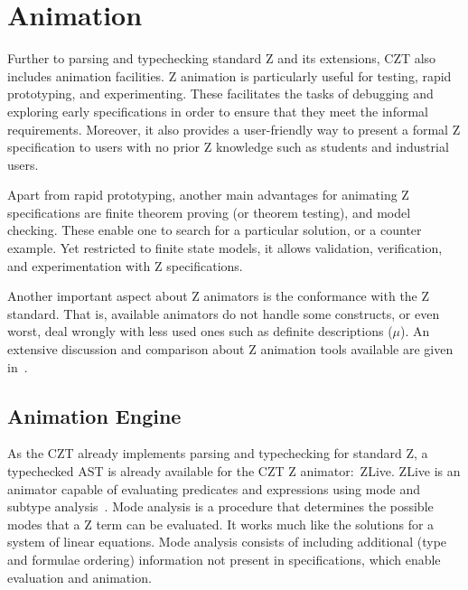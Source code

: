 \documentclass{llncs}
\begin{document}
\section{Animation}
\label{animation}

    Further to parsing and typechecking standard Z and its extensions,
    CZT also includes animation facilities. Z animation is
    particularly useful for testing, rapid prototyping, and
    experimenting. These facilitates the tasks of debugging and
    exploring early specifications in order to ensure that they meet
    the informal requirements.  Moreover, it also provides a
    user-friendly way to present a formal Z specification to users
    with no prior Z knowledge such as students and industrial users.

    Apart from rapid prototyping, another main advantages for
    animating Z specifications are finite theorem proving (or theorem
    testing), and model checking.  These enable one to search for a
    particular solution, or a counter example.  Yet restricted to
    finite state models, it allows validation, verification, and
    experimentation with Z specifications.

    Another important aspect about Z animators is the conformance with
    the Z standard.  That is, available animators do not handle some
    constructs, or even worst, deal wrongly with less used ones such
    as definite descriptions ($\mu$).  An extensive discussion and
    comparison about Z animation tools available are given
    in~\cite{utting-jaza}.

\subsection{Animation Engine}

    As the CZT already implements parsing and typechecking for
    standard Z, a typechecked AST is already available for the CZT Z
    animator:~ZLive.  ZLive is an animator capable of evaluating
    predicates and expressions using mode and subtype
    analysis~\cite{winikooff98}.  Mode analysis is a procedure that
    determines the possible modes that a Z term can be evaluated. It
    works much like the solutions for a system of linear equations.
    Mode analysis consists of including additional (type and formulae
    ordering) information not present in specifications, which enable
    evaluation and animation.
\end{document}
